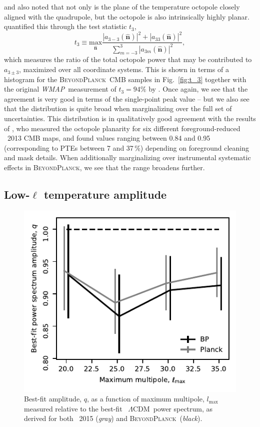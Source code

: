 \documentclass[twocolumn]{aa}
\def\WMAP{\textit{WMAP}}
\def\LCDM{$\Lambda$CDM}
\newcommand{\BP}{\textsc{BeyondPlanck}}
\begin{document}
\citet{Tegmark:2003ve} and \citet{dOC2004} also noted that not only is the plane
of the temperature octopole closely aligned with the quadrupole, but
the octopole is also intrinsically highly planar. \citet{dOC2004}
quantified this through the test statistic $t_3$,
\begin{equation}
  t_3 \equiv \underset{\hat{\textbf{n}}}{\textrm{max}}  \frac{|a_{3-3}(\hat{\textbf{n}})|^2 + |a_{33}(\hat{\textbf{n}})|^2}{\sum^{3}_{m=-3}|a_{3m}(\hat{\textbf{n}})|^2},
\end{equation}
which measures the ratio of the total octopole power that may be
contributed to $a_{3\pm3}$, maximized over all coordinate
systems. This is shown in terms of a histogram for the \BP\ CMB
samples in Fig.~\ref{fig:t_3} together with the original
\WMAP\ measurement of $t_3=94\%$ by \citet{dOC2004}. Once again, we
see that the agreement is very good in terms of the single-point peak
value -- but we also see that the distribution is quite broad when
marginalizing over the full set of uncertainties. This distribution is
in qualitatively good agreement with the results of
\citet{rassat:2014}, who measured the octopole planarity for six
different foreground-reduced \Planck\ 2013 CMB maps, and found values
ranging between 0.84 and 0.95 (corresponding to PTEs between 7 and
37\,\%) depending on foreground cleaning and mask details. When
additionally marginalizing over instrumental systematic effects in
\BP, we see that the range broadens further.

\subsection{Low-$\ell$ temperature amplitude}
\label{sec:lowell_amp}

\begin{figure}
  \includegraphics[width=\linewidth]{figs/best_q_fit.pdf}
  \caption{Best-fit amplitude, $q$, as a function of maximum
    multipole, $l_{\mathrm{max}}$ measured relative to the best-fit
    \Planck\ \LCDM\ power spectrum, as derived for both \Planck\ 2015
    (\emph{gray}) and \BP\ (\emph{black}).}
  \label{fig:best_fit_q}
\end{figure}
\end{document}
